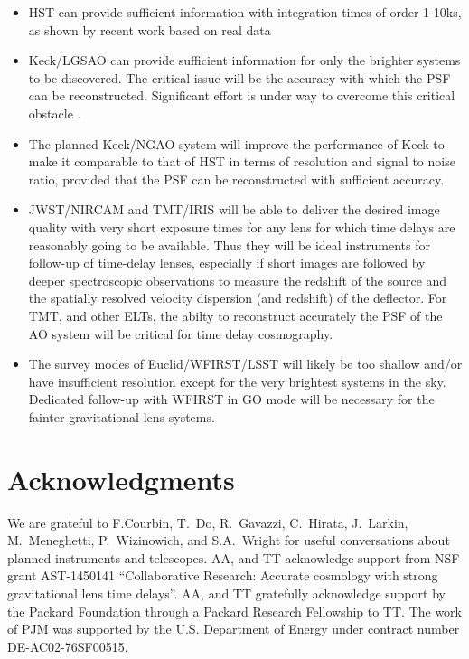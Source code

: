 \documentclass[a4paper,11pt]{article}
\begin{document}
\begin{itemize}
\item HST can provide sufficient information with integration times of order 1-10ks, as shown by recent work based on real data
\item Keck/LGSAO can provide sufficient information for only the brighter systems to be discovered. The critical issue will be the accuracy with which the PSF can be reconstructed. Significant effort is under way to overcome this critical obstacle \cite{2014SPIE.9148E..4SJ}.
\item The planned Keck/NGAO system will improve the performance of Keck to make it comparable to that of HST in terms of resolution and signal to noise ratio, provided that the PSF can be reconstructed with sufficient accuracy.
\item JWST/NIRCAM and TMT/IRIS will be able to deliver the desired image quality with very short exposure times for any lens for which time delays are reasonably going to be available. Thus they will be ideal instruments for follow-up of time-delay lenses, especially if short images are followed by deeper spectroscopic observations to measure the redshift of the source and the spatially resolved velocity dispersion (and redshift) of the deflector. For TMT, and other ELTs, the abilty to reconstruct accurately the PSF of the AO system \cite{2014SPIE.9148E..10H} will be critical for time delay cosmography.
\item The survey modes of Euclid/WFIRST/LSST will likely be too shallow and/or have insufficient resolution except for the very brightest systems in the sky. Dedicated follow-up with WFIRST in GO mode will be necessary for the fainter gravitational lens systems.
\end{itemize}

\section*{Acknowledgments}

We are grateful to F.Courbin, T.~Do, R.~Gavazzi, C.~Hirata, J.~Larkin,
M.~Meneghetti, P.~Wizinowich, and S.A.~Wright for useful conversations
about planned instruments and telescopes. AA, and TT acknowledge
support from NSF grant AST-1450141 ``Collaborative Research: Accurate
cosmology with strong gravitational lens time delays''. AA, and TT
gratefully acknowledge support by the Packard Foundation through a
Packard Research Fellowship to TT.  The work of PJM was supported by
the U.S.  Department of Energy under contract number
DE-AC02-76SF00515.\\
\end{document}
